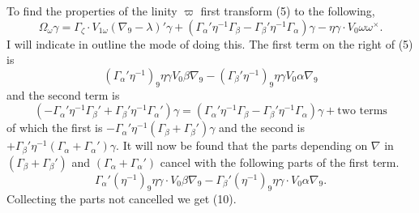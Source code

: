 \documentclass[11pt]{article}
\begin{document}
\indent To find the properties of the linity $\varpi$ first transform (5) to the following,
\begin{equation}\Omega_\omega\gamma=\Gamma_\zeta\mathbin{\cdot}V_{1\omega}(\nabla_9-\lambda)'\gamma+(\Gamma_\alpha'\eta^{-1}\Gamma_\beta-\Gamma_\beta'\eta^{-1}\Gamma_\alpha)\gamma-\eta\gamma\mathbin{\cdot}V_0\omega\omega^\times.\tag{10}\end{equation}
I will indicate in outline the mode of doing this. The first term on the right of (5) is
\[
(\Gamma_\alpha'\eta^{-1})_9\eta\gamma V_0\beta\nabla_9-(\Gamma_\beta'\eta^{-1})_9\eta\gamma V_0\alpha\nabla_9
\]
and the second term is
\[
(-\Gamma_\alpha'\eta^{-1}\Gamma_\beta'+\Gamma_\beta'\eta^{-1}\Gamma_\alpha')\gamma=(\Gamma_\alpha'\eta^{-1}\Gamma_\beta-\Gamma_\beta'\eta^{-1}\Gamma_\alpha)\gamma+\text{two terms}
\]
of which the first is $-\Gamma_\alpha'\eta^{-1}(\Gamma_\beta+\Gamma_\beta')\gamma$ and the second is $+\Gamma_\beta'\eta^{-1}(\Gamma_\alpha+\Gamma_\alpha')\gamma$. It will now be found that the parts depending on $\nabla$ in $(\Gamma_\beta+\Gamma_\beta')$ and $(\Gamma_\alpha+\Gamma_\alpha')$ cancel with the following parts of the first term.
\[
\Gamma_\alpha'(\eta^{-1})_9\eta\gamma\mathbin{\cdot}V_0\beta\nabla_9-\Gamma_\beta'(\eta^{-1})_9\eta\gamma\mathbin{\cdot}V_0\alpha\nabla_9.
\]
Collecting the parts not cancelled we get (10).
\end{document}
